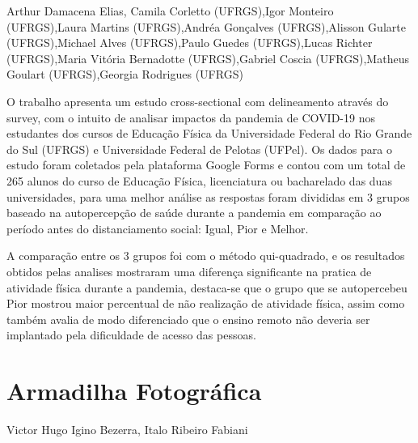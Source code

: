 Arthur Damacena Elias, Camila Corletto (UFRGS),Igor Monteiro (UFRGS),Laura Martins (UFRGS),Andréa Gonçalves (UFRGS),Alisson Gularte (UFRGS),Michael Alves (UFRGS),Paulo Guedes (UFRGS),Lucas Richter (UFRGS),Maria Vitória Bernadotte (UFRGS),Gabriel Coscia (UFRGS),Matheus Goulart (UFRGS),Georgia Rodrigues (UFRGS)

O trabalho apresenta um estudo  cross-sectional com delineamento através do survey, com o intuito de analisar impactos da pandemia de COVID-19 nos estudantes dos cursos de Educação Física da Universidade Federal do Rio Grande do Sul (UFRGS) e Universidade Federal de Pelotas (UFPel). Os dados para o estudo foram coletados pela plataforma Google Forms e contou com um total de 265 alunos do curso de Educação Física, licenciatura ou bacharelado das duas universidades, para uma melhor análise as respostas foram divididas em 3 grupos baseado na autopercepção de saúde durante a pandemia em comparação ao período antes do distanciamento social: Igual, Pior e Melhor.

A comparação entre os 3 grupos foi com o método qui-quadrado, e os resultados obtidos pelas analises mostraram uma diferença significante na pratica de atividade física durante a pandemia, destaca-se que o grupo que se autopercebeu Pior mostrou maior percentual de não realização de atividade física, assim como também avalia de modo diferenciado que o ensino remoto não deveria ser implantado pela dificuldade de acesso das pessoas. 
 





\section*{Armadilha Fotográfica}

Victor Hugo Igino Bezerra, Italo Ribeiro Fabiani

